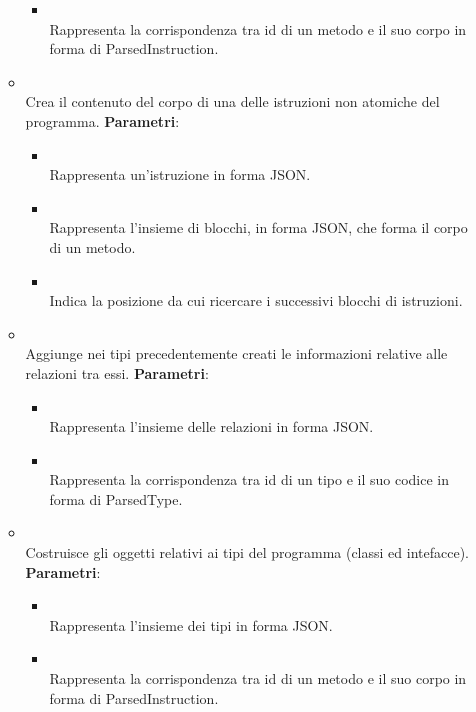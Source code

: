 \begin{itemize}
\begin{itemize}
\begin{itemize}
\item {}
\\ Rappresenta la corrispondenza tra id di un metodo e il suo corpo in forma di ParsedInstruction.
\end{itemize}
\item {}
\\ Crea il contenuto del corpo di una delle istruzioni non atomiche del programma.
\textbf{Parametri}:
\begin{itemize}
\item {}
\\ Rappresenta un'istruzione in forma JSON.
\item {}
\\ Rappresenta l'insieme di blocchi, in forma JSON, che forma il corpo di un metodo.
\item {}
\\ Indica la posizione da cui ricercare i successivi blocchi di istruzioni.
\end{itemize}
\item {}
\\ Aggiunge nei tipi precedentemente creati le informazioni relative alle relazioni tra essi.
\textbf{Parametri}:
\begin{itemize}
\item {}
\\ Rappresenta l'insieme delle relazioni in forma JSON.
\item {}
\\ Rappresenta la corrispondenza tra id di un tipo e il suo codice in forma di ParsedType.
\end{itemize}
\item {}
\\ Costruisce gli oggetti relativi ai tipi del programma (classi ed intefacce).
\textbf{Parametri}:
\begin{itemize}
\item {}
\\ Rappresenta l'insieme dei tipi in forma JSON.
\item {}
\\ Rappresenta la corrispondenza tra id di un metodo e il suo corpo in forma di ParsedInstruction.
\end{itemize}
\end{itemize}
\end{itemize}

